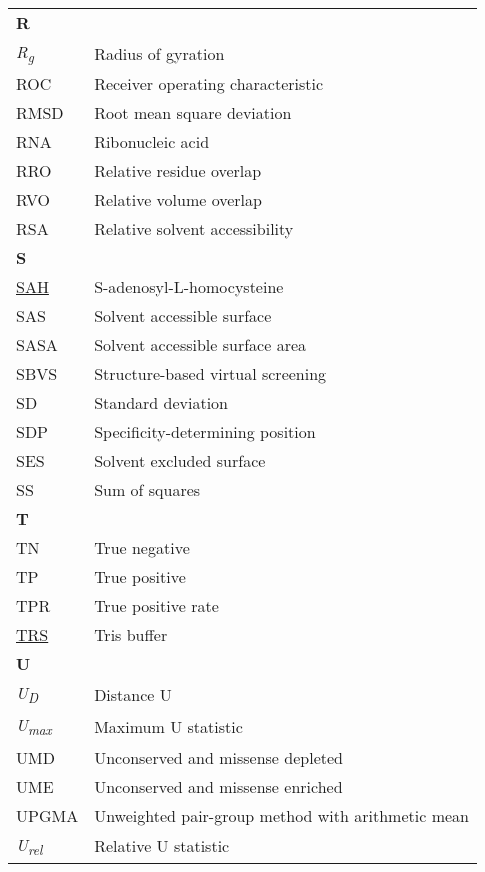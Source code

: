 \begin{longtable}[l]{@{}p{2.5cm}p{12cm}@{}}
\textbf{\large R} & \\[0.25cm]
\textmd{\textit{R\textsubscript{g}}} & Radius of gyration \\
\textmd{ROC} & Receiver operating characteristic \\
\textmd{RMSD} & Root mean square deviation \\
\textmd{RNA} & Ribonucleic acid \\
\textmd{RRO} & Relative residue overlap \\
\textmd{RVO} & Relative volume overlap \\
\textmd{RSA} & Relative solvent accessibility \\[0.3175cm]
\textbf{\large S} & \\[0.25cm]
\textmd{\href{https://www.ebi.ac.uk/pdbe-srv/pdbechem/chemicalCompound/show/SAH}{SAH}} & S-adenosyl-L-homocysteine \\
\textmd{SAS} & Solvent accessible surface \\
\textmd{SASA} & Solvent accessible surface area \\
\textmd{SBVS} & Structure-based virtual screening \\
\textmd{SD} & Standard deviation \\
\textmd{SDP} & Specificity-determining position \\
\textmd{SES} & Solvent excluded surface \\
\textmd{SS} & Sum of squares \\[0.3175cm]
\textbf{\large T} & \\[0.25cm]
\textmd{TN} & True negative \\
\textmd{TP} & True positive \\
\textmd{TPR} & True positive rate \\
\textmd{\href{https://www.ebi.ac.uk/pdbe-srv/pdbechem/chemicalCompound/show/TRS}{TRS}} & Tris buffer \\[0.3175cm]
\textbf{\large U} & \\[0.25cm]
\textmd{\textit{U\textsubscript{D}}} & Distance U \\
\textmd{\textit{U\textsubscript{max}}} & Maximum U statistic \\
\textmd{UMD} & Unconserved and missense depleted \\
\textmd{UME} & Unconserved and missense enriched \\
\textmd{UPGMA} & Unweighted pair-group method with arithmetic mean \\
\textmd{\textit{U\textsubscript{rel}}} & Relative U statistic \\[0.3175cm]

\end{longtable}
